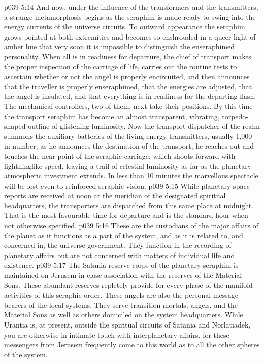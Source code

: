\vs p039 5:14 And now, under the influence of the transformers and the transmitters, a strange metamorphosis begins as the seraphim is made ready to swing into the energy currents of the universe circuits. To outward appearance the seraphim grows pointed at both extremities and becomes so enshrouded in a queer light of amber hue that very soon it is impossible to distinguish the enseraphimed personality. When all is in readiness for departure, the chief of transport makes the proper inspection of the carriage of life, carries out the routine tests to ascertain whether or not the angel is properly encircuited, and then announces that the traveller is properly enseraphimed, that the energies are adjusted, that the angel is insulated, and that everything is in readiness for the departing flash. The mechanical controllers, two of them, next take their positions. By this time the transport seraphim has become an almost transparent, vibrating, torpedo\hyp{}shaped outline of glistening luminosity. Now the transport dispatcher of the realm summons the auxiliary batteries of the living energy transmitters, usually 1,000 in number; as he announces the destination of the transport, he reaches out and touches the near point of the seraphic carriage, which shoots forward with lightninglike speed, leaving a trail of celestial luminosity as far as the planetary atmospheric investment extends. In less than 10 minutes the marvellous spectacle will be lost even to reinforced seraphic vision.
\vs p039 5:15 \pc While planetary space reports are received at noon at the meridian of the designated spiritual headquarters, the transporters are dispatched from this same place at midnight. That is the most favourable time for departure and is the standard hour when not otherwise specified.
\vs p039 5:16 \bibnobreakspace {} These are the custodians of the major affairs of the planet as it functions as a part of the system, and as it is related to, and concerned in, the universe government. They function in the recording of planetary affairs but are not concerned with matters of individual life and existence.
\vs p039 5:17 \bibnobreakspace {} The Satania reserve corps of the planetary seraphim is maintained on Jerusem in close association with the reserves of the Material Sons. These abundant reserves repletely provide for every phase of the manifold activities of this seraphic order. These angels are also the personal message bearers of the local systems. They serve transition mortals, angels, and the Material Sons as well as others domiciled on the system headquarters. While Urantia is, at present, outside the spiritual circuits of Satania and Norlatiadek, you are otherwise in intimate touch with interplanetary affairs, for these messengers from Jerusem frequently come to this world as to all the other spheres of the system.
